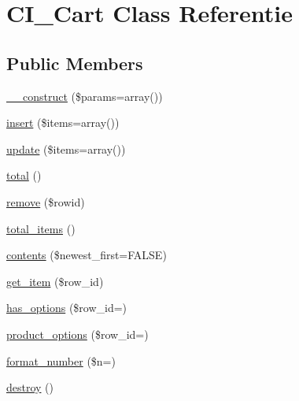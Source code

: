 \hypertarget{class_c_i___cart}{}\section{C\+I\+\_\+\+Cart Class Referentie}
\label{class_c_i___cart}
\subsection*{Public Members}
\begin{DoxyCompactItemize}
\item 
\mbox{\hyperlink{class_c_i___cart_a568ecdb0d73d2a870f33189739922a50}{\+\_\+\+\_\+construct}} (\$params=array())
\item 
\mbox{\hyperlink{class_c_i___cart_a07488e002c513013079157a9fe61a8e3}{insert}} (\$items=array())
\item 
\mbox{\hyperlink{class_c_i___cart_adddf5d1a4f704b647f28b0322f8b64f2}{update}} (\$items=array())
\item 
\mbox{\hyperlink{class_c_i___cart_a9efa17b570797933c7c5b0c68f743a55}{total}} ()
\item 
\mbox{\hyperlink{class_c_i___cart_acb40031fae650e22e4a32878c02dfbf7}{remove}} (\$rowid)
\item 
\mbox{\hyperlink{class_c_i___cart_a785be13903ee65b8936d523b2728e53a}{total\+\_\+items}} ()
\item 
\mbox{\hyperlink{class_c_i___cart_a9d7b86f0ac41c6301e6373644011d87f}{contents}} (\$newest\+\_\+first=F\+A\+L\+SE)
\item 
\mbox{\hyperlink{class_c_i___cart_a73841dfae18a2719c7eb6d31978067a9}{get\+\_\+item}} (\$row\+\_\+id)
\item 
\mbox{\hyperlink{class_c_i___cart_a276cedf02c823357a2b643a13806f2be}{has\+\_\+options}} (\$row\+\_\+id=\textquotesingle{}\textquotesingle{})
\item 
\mbox{\hyperlink{class_c_i___cart_a461e270ceff8b04d40e14e00b9c74447}{product\+\_\+options}} (\$row\+\_\+id=\textquotesingle{}\textquotesingle{})
\item 
\mbox{\hyperlink{class_c_i___cart_aea64eda9cf978b1e25c24458ca7e69df}{format\+\_\+number}} (\$n=\textquotesingle{}\textquotesingle{})
\item 
\mbox{\hyperlink{class_c_i___cart_aa118461de946085fe42989193337044a}{destroy}} ()
\end{DoxyCompactItemize}
